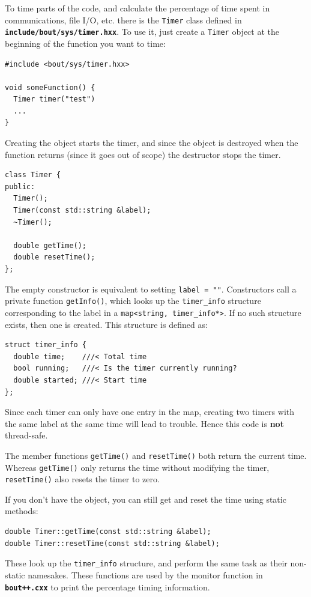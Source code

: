 \documentclass[12pt]{article}
\newcommand{\file}[1]{\texttt{\bf #1}}
\begin{document}
To time parts of the code, and calculate the percentage of time spent in communications, file I/O, etc. there is the \lstinline!Timer! class defined
in \file{include/bout/sys/timer.hxx}. To use it, just create a \lstinline!Timer!
object at the beginning of the function you want to time:
\begin{lstlisting}
#include <bout/sys/timer.hxx>

void someFunction() {
  Timer timer("test")
  ...
}
\end{lstlisting}
Creating the object starts the timer, and since the object is destroyed when
the function returns (since it goes out of scope) the destructor stops
the timer.
\begin{lstlisting}
class Timer {
public:
  Timer();
  Timer(const std::string &label);
  ~Timer();

  double getTime();
  double resetTime();
};
\end{lstlisting}
The empty constructor is equivalent to setting \lstinline!label = ""!.
Constructors call a private function \lstinline!getInfo()!, which looks
up the \lstinline!timer_info! structure corresponding to the label in
a \lstinline!map<string, timer_info*>!. If no such structure exists, then one
is created. This structure is defined as:
\begin{lstlisting}
struct timer_info {
  double time;    ///< Total time
  bool running;   ///< Is the timer currently running?
  double started; ///< Start time
};
\end{lstlisting}
Since each timer can only have one entry in the map, creating two
timers with the same label at the same time will lead to trouble.
Hence this code is {\bf not} thread-safe.

The member functions \lstinline!getTime()! and \lstinline!resetTime()!
both return the current time. Whereas \lstinline!getTime()! only returns
the time without modifying the timer, \lstinline!resetTime()! also resets
the timer to zero.

If you don't have the object, you can still get and reset the time using
static methods:
\begin{lstlisting}
double Timer::getTime(const std::string &label);
double Timer::resetTime(const std::string &label);
\end{lstlisting}
These look up the \lstinline!timer_info! structure, and perform
the same task as their non-static namesakes. These functions are used by the
monitor function in \file{bout++.cxx} to print the percentage timing information.
\end{document}
